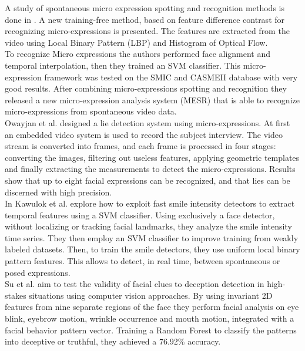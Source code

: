 A study of spontaneous micro expression spotting and recognition methods is done in \cite{xli2015reading}. A new training-free method, based on feature difference contrast for recognizing micro-expressions is presented. The features are extracted from the video using Local Binary Pattern (LBP) and Histogram of Optical Flow. \\
To recognize Micro expressions the authors performed face alignment and temporal interpolation, then they trained an SVM classifier. This micro-expression framework was tested on the SMIC and CASMEII database with very good results. After combining micro-expressions spotting and recognition they released a new micro-expression analysis system (MESR) that is able to recognize micro-expressions from spontaneous video data. \\

Owayjan et al. \cite{6462897} designed a lie detection system using micro-expressions. At first an embedded video system is used to record the subject interview. The video stream is converted into frames, and each frame is processed in four stages: converting the images, filtering out useless features, applying geometric templates and finally extracting the measurements to detect the micro-expressions. Results show that up to eight facial expressions can be recognized, and that lies can be discerned with high precision. \\

In \cite{10.1007/978-3-319-47955-2_27} Kawulok et al. explore how to exploit fast smile intensity detectors to extract temporal features using a SVM classifier. Using exclusively a face detector, without localizing or tracking facial landmarks, they analyze the smile intensity time series. They then employ an SVM classifier to improve training from weakly labeled datasets. Then, to train the smile detectors, they use uniform local binary pattern features. This allows to detect, in real time, between spontaneous or posed expressions. \\

Su et al. \cite{SU201652} aim to test the validity of facial clues to deception detection in high-stakes situations using computer vision approaches. By using invariant 2D features from nine separate regions of the face they perform facial analysis on eye blink, eyebrow motion, wrinkle occurrence and mouth motion, integrated with a facial behavior pattern vector. Training a Random Forest to classify the patterns into deceptive or truthful, they achieved a 76.92\% accuracy. \\

